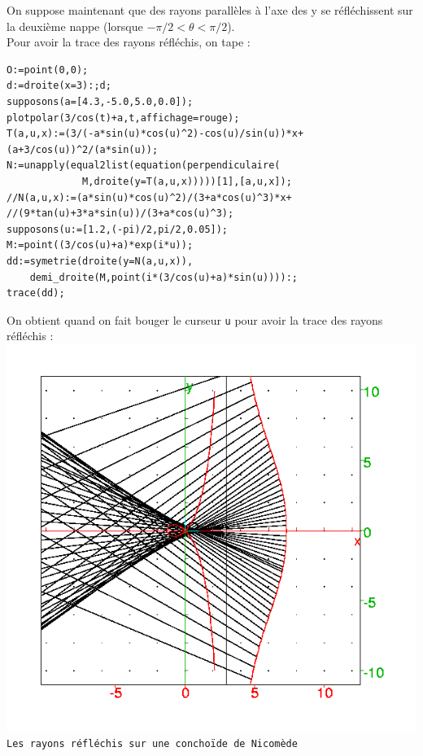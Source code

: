 \documentclass[a4paper,11pt]{book}
\begin{document}
On suppose maintenant que des rayons parall\`eles \`a l'axe des y se 
r\'efl\'echissent
sur la deuxi\`eme nappe (lorsque $-\pi/2<\theta<\pi/2$).\\
Pour avoir la trace  des rayons r\'efl\'echis, on tape : 
\begin{verbatim}
O:=point(0,0);
d:=droite(x=3):;d;
supposons(a=[4.3,-5.0,5.0,0.0]);
plotpolar(3/cos(t)+a,t,affichage=rouge);
T(a,u,x):=(3/(-a*sin(u)*cos(u)^2)-cos(u)/sin(u))*x+
(a+3/cos(u))^2/(a*sin(u));
N:=unapply(equal2list(equation(perpendiculaire(
             M,droite(y=T(a,u,x)))))[1],[a,u,x]);
//N(a,u,x):=(a*sin(u)*cos(u)^2)/(3+a*cos(u)^3)*x+
//(9*tan(u)+3*a*sin(u))/(3+a*cos(u)^3);
supposons(u:=[1.2,(-pi)/2,pi/2,0.05]);
M:=point((3/cos(u)+a)*exp(i*u));
dd:=symetrie(droite(y=N(a,u,x)),
    demi_droite(M,point(i*(3/cos(u)+a)*sin(u)))):;
trace(dd);
\end{verbatim}
On obtient quand on fait bouger le curseur {\tt u} pour avoir la trace  
des rayons r\'efl\'echis :\\
 \includegraphics[width=\textwidth]{nicorefl}\\
{\tt Les rayons r\'efl\'echis sur une concho\"{i}de de Nicom\`ede}
\end{document}
